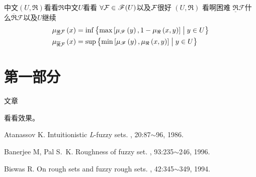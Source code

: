 \documentclass[12pt,a4paper,twoside]{article}
\begin{document}
\begin{definition}[中文定义]

中文$\left( U,\Re \right)$看看$\Re$中文$U$看看 $\forall
\mathcal{F}\in\mathscr{F}(U)$以及$\mathcal{F}$很好 $\left(U,\Re\right)$ 看啊困难
$\underline{\Re}\mathcal {F}$什么$\overline{\Re}\mathcal
{F}$以及$U$继续
 {\begin{eqnarray}
 \begin{split}
 \mu_{\underline{\Re}\mathcal {F}}\left( x\right)
      &= \inf\left\{\max \left[ \mu _{\mathscr{F}} \left( y \right),1 - \mu_\Re\left(x,y\right) \right]\bigm| y \in U  \right\} \\
 \mu_{\overline{\Re}\mathcal {F}}\left( x\right)
      &= \sup\left\{{\min \left[ \mu _{\mathscr{F}} \left( y \right),\mu_\Re\left(x,y\right) \right]\bigm| y \in U}\right\}
 \end{split}
\end{eqnarray}\label{eq:dubois1}}

\end{definition}



\section{\F 第一部分}

文章

\clearpage

看看效果。\cite{Biswas}


\begin{thebibliography}{10}

\scriptsize \addtolength{\itemsep}{-1.0em}    


Atanassov K.
\newblock Intuitionistic \textit{L}-fuzzy sets.
, 20:87$\sim$96, 1986.






 Banerjee M, Pal S.~K.                                        
\newblock Roughness of fuzzy set.                             %
, 93:235$\sim$246, 1996. 



 Biswas R.
\newblock On rough sets and fuzzy rough sets.
,
  42:345$\sim$349, 1994.




\end{thebibliography}
\end{document}
